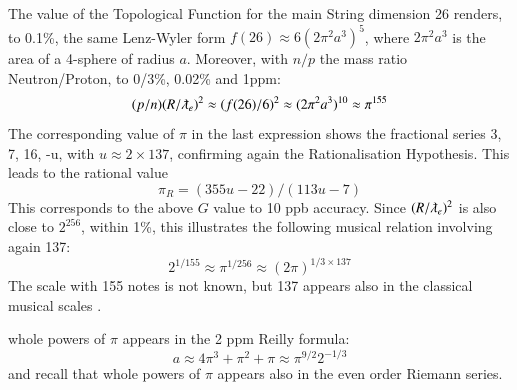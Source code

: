 \documentclass[twoside,draft]{article}
\begin{document}
\begin{sloppypar}
The value of the Topological Function for the main String
 dimension 26 renders, to 0.1\%, the same Lenz-Wyler form $f(26) \approx 6(2\pi^{2} a^{3} )^{5}$, where $2\pi^{2}a^{3}$ is the area of a 4-sphere of radius $a$. Moreover, with $n/p$ the mass ratio Neutron/Proton, to 0/3\%, 0.02\% and 1ppm:
$$(p/n) (R/\lambdabar_{e})^{2} \approx (f(26)/6)^{2} \approx (2\pi^{2} a^{3})^{10} \approx \pi^{155}$$
The corresponding value of $\pi$ in the last expression shows the fractional series 3, 7, 16, -u, with $u \approx
2 \times 137$, confirming again the Rationalisation Hypothesis. This leads to the rational value
\begin{equation}
\pi_{R} = (355u-22)/(113u-7) 
\end{equation}
This corresponds to the above $G$ value to 10 ppb accuracy.
Since $(R/\lambdabar_{e})^{2}$ is also close to $2^{256}$, within 1\%, this illustrates the following musical relation involving again 137:
$$2^{1/155} \approx \pi^{1/256} \approx (2\pi)^{1/3 \times 137}$$
The scale with 155 notes is not known, but 137 appears also in the classical musical scales \cite{Sanchez1}. 

whole powers of $\pi$ appears in the 2 ppm Reilly formula: 
\begin{equation}
a \approx 4\pi^{3} + \pi^{2} + \pi \approx \pi^{9/2}2^{-1/3}
\end{equation}
and recall that whole powers of $\pi$ appears also in the even order Riemann series.


\end{sloppypar}
\end{document}
